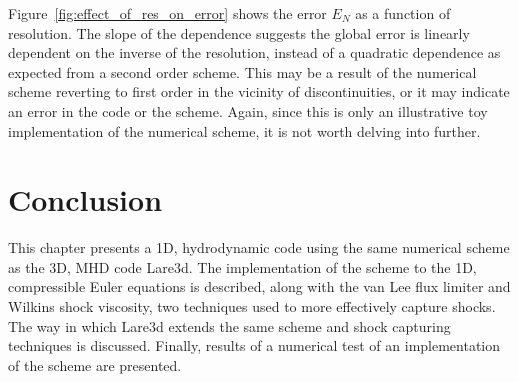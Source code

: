Figure~\ref{fig:effect_of_res_on_error} shows the error $E_N$ as a function of resolution. The slope of the dependence suggests the global error is linearly dependent on the inverse of the resolution, instead of a quadratic dependence as expected from a second order scheme. This may be a result of the numerical scheme reverting to first order in the vicinity of discontinuities, or it may indicate an error in the code or the scheme. Again, since this is only an illustrative toy implementation of the numerical scheme, it is not worth delving into further.

\section{Conclusion}

This chapter presents a 1D, hydrodynamic code using the same numerical scheme as the 3D, MHD code Lare3d. The implementation of the scheme to the 1D, compressible Euler equations is described, along with the van Lee flux limiter and Wilkins shock viscosity, two techniques used to more effectively capture shocks. The way in which Lare3d extends the same scheme and shock capturing techniques is discussed. Finally, results of a numerical test of an implementation of the scheme are presented.
